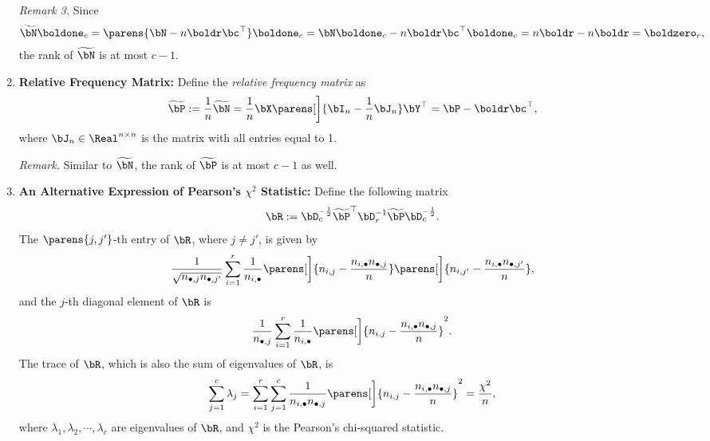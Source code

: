 \documentclass[12pt]{article}
\begin{document}
\begin{enumerate}[label=\textbf{\arabic*.}]
	\textit{Remark 3.} Since 
	\begin{align*}
		\widetilde{\bN} \boldone_c = \parens{\bN - n \boldr \bc^\top } \boldone_c = \bN \boldone_c - n \boldr \bc^\top \boldone_c = n \boldr - n \boldr = \boldzero_{r}, 
	\end{align*}
	the rank of $\widetilde{\bN}$ is at most $c - 1$. 
	
	\item \textbf{Relative Frequency Matrix:} Define the \emph{relative frequency matrix} as 
	\begin{align*}
		\widetilde{\bP} := \frac{1}{n} \widetilde{\bN} = \frac{1}{n} \bX \parens[\bigg]{\bI_n - \frac{1}{n} \bJ_n} \bY^\top = \bP - \boldr \bc^\top, 
	\end{align*}
	where $\bJ_n \in \Real^{n \times n}$ is the matrix with all entries equal to 1. 
	
	\textit{Remark.} Similar to $\widetilde{\bN}$, the rank of $\widetilde{\bP}$ is at most $c - 1$ as well. 
	
	\item \textbf{An Alternative Expression of Pearson's $\chi^2$ Statistic:} Define the following matrix 
	\begin{align}\label{eq-matrix-r}
		\bR := \bD_c^{-\frac{1}{2}} \widetilde{\bP}^\top \bD_r^{-1} \widetilde{\bP} \bD_c^{-\frac{1}{2}}. 
	\end{align}
	The $\parens{j,j'}$-th entry of $\bR$, where $j \neq j'$, is given by 
	\begin{align*}
		\frac{1}{\sqrt{n_{\bullet,j} n_{\bullet,j'}}} \sum_{i=1}^r \frac{1}{n_{i,\bullet}} \parens[\bigg]{n_{i,j} - \frac{n_{i,\bullet} n_{\bullet,j}}{n}} \parens[\bigg]{n_{i,j'} - \frac{n_{i,\bullet} n_{\bullet,j'}}{n}}, 
	\end{align*}
	and the $j$-th diagonal element of $\bR$ is 
	\begin{align*}
		\frac{1}{n_{\bullet,j}} \sum_{i=1}^r \frac{1}{n_{i,\bullet}} \parens[\bigg]{n_{i,j} - \frac{n_{i,\bullet} n_{\bullet,j}}{n}}^2. 
	\end{align*}
	The trace of $\bR$, which is also the sum of eigenvalues of $\bR$, is 
	\begin{align}\label{eq-total-inertia}
		\sum_{j=1}^c \lambda_j = \sum_{i=1}^r \sum_{j=1}^c \frac{1}{n_{i,\bullet} n_{\bullet,j}} \parens[\bigg]{n_{i,j} - \frac{n_{i,\bullet} n_{\bullet,j}}{n}}^2 = \frac{\chi^2}{n}, 
	\end{align}
	where $\lambda_1, \lambda_2, \cdots, \lambda_c$ are eigenvalues of $\bR$, and $\chi^2$ is the Pearson's chi-squared statistic. 
	

\end{enumerate}
\end{document}
